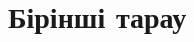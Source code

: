 \documentclass[\basefontsize pt, oneside]{memoir}
\title{\booktitle}
\author{\bookauthor}
\date{}
\begin{document}
\frontmatter
\begin{titlingpage}
  \centering
  \vspace*{4cm}
  {\huge\bfseries \booktitle \par}
  \vspace{1cm}
  {\Large \bookauthor \par}
\end{titlingpage}

\mainmatter

\chapter{Бірінші тарау}


\end{document}
